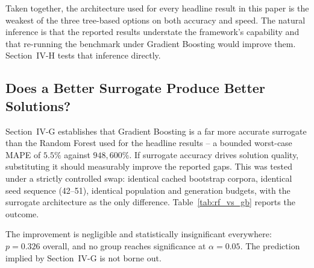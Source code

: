 \documentclass[conference]{IEEEtran}
\begin{document}
Taken together, the architecture used for every headline result in this paper
is the weakest of the three tree-based options on both accuracy and speed.
The natural inference is that the reported results understate the framework's
capability and that re-running the benchmark under Gradient Boosting would
improve them. Section~IV-H tests that inference directly.

\subsection{Does a Better Surrogate Produce Better Solutions?}

Section~IV-G establishes that Gradient Boosting is a far more accurate
surrogate than the Random Forest used for the headline results -- a bounded
worst-case MAPE of $5.5\%$ against $948{,}600\%$. If surrogate accuracy drives
solution quality, substituting it should measurably improve the reported gaps.
This was tested under a strictly controlled swap: identical cached bootstrap
corpora, identical seed sequence (42--51), identical population and generation
budgets, with the surrogate architecture as the only difference.
Table~\ref{tab:rf_vs_gb} reports the outcome.

\begin{table}[t]
\centering
\caption{Hybrid ML-GA under a Random Forest versus a Gradient Boosting surrogate, all else held identical. Despite a five-order-of-magnitude difference in worst-case surrogate MAPE, no group shows a significant difference in solution quality.}
\label{tab:rf_vs_gb}
\end{table}

The improvement is negligible and statistically insignificant everywhere:
$p = 0.326$ overall, and no group reaches significance at $\alpha = 0.05$. The
prediction implied by Section~IV-G is not borne out.
\end{document}
